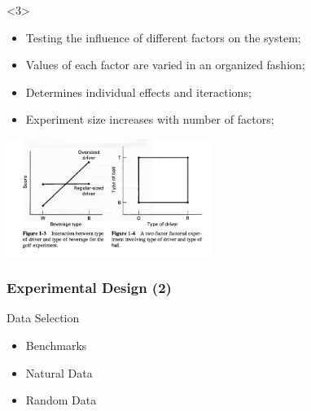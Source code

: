 \documentclass{beamer}
\begin{document}
\begin{frame}
{  \begin{onlyenv}<3>
    \begin{itemize}
    \item Testing the influence of different factors on the system;
    \item Values of each factor are varied in an organized fashion;
    \item Determines individual effects and iteractions;
    \item Experiment size increases with number of factors;
    \end{itemize}
    \begin{center}
      \includegraphics[width=0.5\textwidth]{img/factorialplanning}
    \end{center}
  \end{onlyenv}
  }
\end{frame}

\begin{frame}
  \frametitle{Experimental Design (2)}
  \begin{block}{Data Selection}
    \begin{itemize}
      \item Benchmarks
      \item Natural Data
      \item Random Data
    \end{itemize}
  \end{block}
\end{frame}
\end{document}
